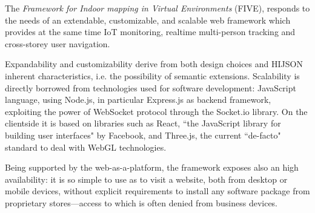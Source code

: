\documentclass[]{egpubl}
\begin{document}
The \emph{Framework for Indoor mapping in Virtual Environments} (FIVE), responds to the needs of an extendable, customizable,
and scalable web framework which provides at the same time IoT monitoring,
realtime multi-person tracking and cross-storey user navigation.

Expandability and customizability derive from both design choices and HIJSON
inherent characteristics, i.e. the possibility of semantic extensions.
Scalability is directly borrowed from technologies used for software
development: JavaScript language, using Node.js, in particular Express.js as
backend framework, exploiting the power of WebSocket protocol through the
Socket.io library. On the clientside it is based on libraries such as React, ``the
JavaScript library for building user interfaces" by Facebook, and Three.js,
the current ``de-facto" standard to deal with WebGL technologies.

Being supported by the web-as-a-platform, the framework exposes also an high
availability: it is so simple to use as to visit a website, both from desktop
or mobile devices, without explicit requirements to install any software
package from proprietary stores---access to which is often denied from business
devices.

\end{document}
